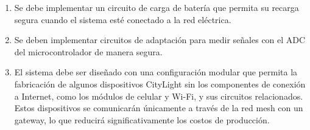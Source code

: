 \documentclass[
11pt, %
]{charter}
\begin{document}
\begin{enumerate}
\begin{enumerate}
			\item Se debe implementar un circuito de carga de batería que permita su recarga segura cuando el sistema esté conectado a la red eléctrica.
			\item Se deben implementar circuitos de adaptación para medir señales con el ADC del microcontrolador de manera segura.
			\item El sistema debe ser diseñado con una configuración modular que permita la fabricación de algunos dispositivos CityLight sin los componentes de conexión a Internet, como los módulos de celular y Wi-Fi, y sus circuitos relacionados. Estos dispositivos se comunicarán únicamente a través de la red mesh con un gateway, lo que reducirá significativamente los costos de producción.
		\end{enumerate}


\end{enumerate}
\end{document}
